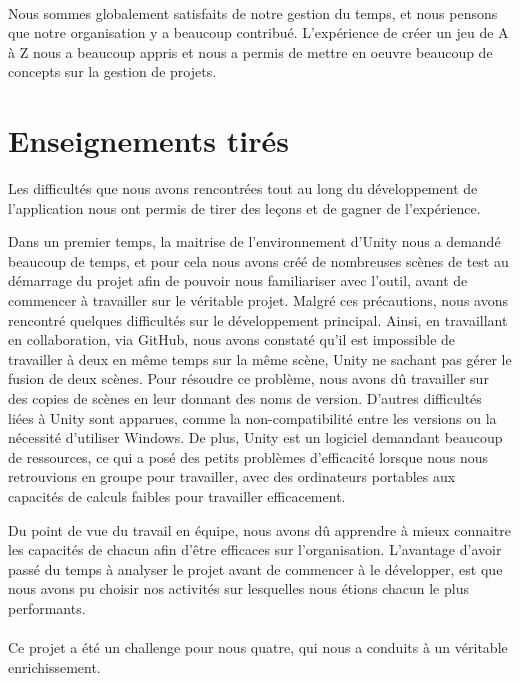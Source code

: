 \paragraph{}
Nous sommes globalement satisfaits de notre gestion du temps, et nous pensons que notre organisation y a beaucoup contribué.
L'expérience de créer un jeu de A à Z nous a beaucoup appris et nous a permis de mettre en oeuvre beaucoup de concepts sur la gestion de projets.

\section{Enseignements tirés}
Les difficultés que nous avons rencontrées tout au long du développement de l'application nous ont permis de tirer des leçons et de gagner de l'expérience.

Dans un premier temps, la maitrise de l'environnement d'Unity nous a demandé beaucoup de temps, et pour cela nous avons créé de nombreuses scènes de test au démarrage du projet afin de pouvoir nous familiariser avec l'outil, avant de commencer à travailler sur le véritable projet. Malgré ces précautions, nous avons rencontré quelques difficultés sur le développement principal. Ainsi, en travaillant en collaboration, via GitHub, nous avons constaté qu'il est impossible de travailler à deux en même temps sur la même scène, Unity ne sachant pas gérer le fusion de deux scènes. Pour résoudre ce problème, nous avons dû travailler sur des copies de scènes en leur donnant des noms de version. D'autres difficultés liées à Unity sont apparues, comme la non-compatibilité entre les versions ou la nécessité d'utiliser Windows. De plus, Unity est un logiciel demandant beaucoup de ressources, ce qui a posé des petits problèmes d'efficacité lorsque nous nous retrouvions en groupe pour travailler, avec des ordinateurs portables aux capacités de calculs faibles pour travailler efficacement.

Du point de vue du travail en équipe, nous avons dû apprendre à mieux connaitre les capacités de chacun afin d'être efficaces sur l'organisation. L'avantage d'avoir passé du temps à analyser le projet avant de commencer à le développer, est que nous avons pu choisir nos activités sur lesquelles nous étions chacun le plus performants.

\paragraph{}
Ce projet a été un challenge pour nous quatre, qui nous a conduits à un véritable enrichissement.


